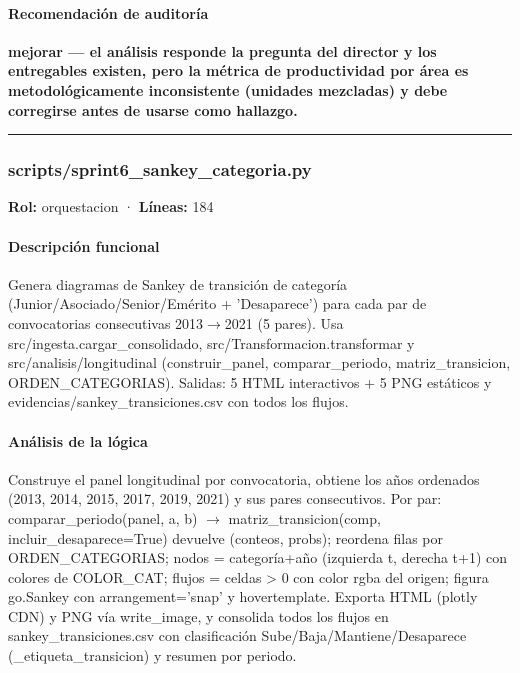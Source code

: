 \paragraph{Recomendación de auditoría}
\textbf{mejorar --- el análisis responde la pregunta del director y los entregables existen, pero la métrica de productividad por área es metodológicamente inconsistente (unidades mezcladas) y debe corregirse antes de usarse como hallazgo.}

\medskip
\hrule

\subsubsection{scripts/sprint6\_sankey\_categoria.py}
\textbf{Rol:} orquestacion · \textbf{Líneas:} 184

\paragraph{Descripción funcional}
Genera diagramas de Sankey de transición de categoría (Junior/Asociado/Senior/Emérito + 'Desaparece') para cada par de convocatorias consecutivas 2013$\rightarrow$2021 (5 pares). Usa src/ingesta.cargar\_consolidado, src/Transformacion.transformar y src/analisis/longitudinal (construir\_panel, comparar\_periodo, matriz\_transicion, ORDEN\_CATEGORIAS). Salidas: 5 HTML interactivos + 5 PNG estáticos y evidencias/sankey\_transiciones.csv con todos los flujos.

\paragraph{Análisis de la lógica}
Construye el panel longitudinal por convocatoria, obtiene los años ordenados (2013, 2014, 2015, 2017, 2019, 2021) y sus pares consecutivos. Por par: comparar\_periodo(panel, a, b) $\rightarrow$ matriz\_transicion(comp, incluir\_desaparece=True) devuelve (conteos, probs); reordena filas por ORDEN\_CATEGORIAS; nodos = categoría+año (izquierda t, derecha t+1) con colores de COLOR\_CAT; flujos = celdas > 0 con color rgba del origen; figura go.Sankey con arrangement='snap' y hovertemplate. Exporta HTML (plotly CDN) y PNG vía write\_image, y consolida todos los flujos en sankey\_transiciones.csv con clasificación Sube/Baja/Mantiene/Desaparece (\_etiqueta\_transicion) y resumen por periodo.

